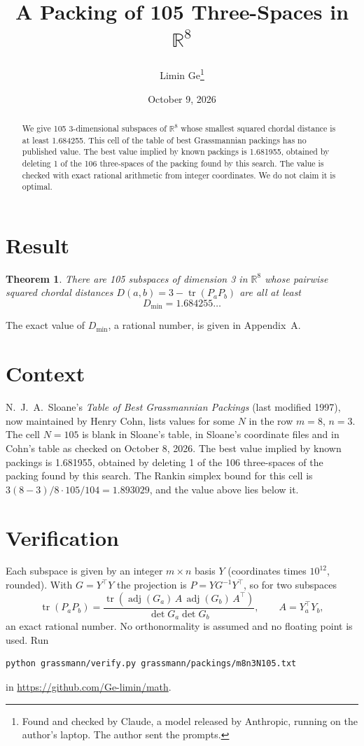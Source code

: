 \documentclass[11pt,a4paper]{article}
\title{A Packing of 105 Three-Spaces in $\mathbb{R}^{8}$}
\author{Limin Ge\thanks{Found and checked by Claude, a model released by Anthropic, running on the author's laptop. The author sent the prompts.}}
\date{October 9, 2026}
\newtheorem*{theorem}{Theorem}
\begin{document}
\maketitle
\begin{abstract}
We give 105 3-dimensional subspaces of $\mathbb{R}^{8}$ whose smallest squared chordal distance is at least 1.684255. This cell of the table of best Grassmannian packings has no published value. The best value implied by known packings is 1.681955, obtained by deleting 1 of the 106 three-spaces of the packing found by this search. The value is checked with exact rational arithmetic from integer coordinates. We do not claim it is optimal.
\end{abstract}

\section{Result}
\begin{theorem}
There are 105 subspaces of dimension 3 in $\mathbb{R}^{8}$ whose pairwise squared chordal distances $D(a,b) = 3 - \operatorname{tr}(P_aP_b)$ are all at least
\[ D_{\min} = 1.684255\ldots \]
\end{theorem}
The exact value of $D_{\min}$, a rational number, is given in Appendix~A.


\section{Context}
N.~J.~A.~Sloane's \emph{Table of Best Grassmannian Packings} (last modified 1997), now maintained by Henry Cohn, lists values for some $N$ in the row $m=8$, $n=3$. The cell $N=105$ is blank in Sloane's table, in Sloane's coordinate files and in Cohn's table as checked on October 8, 2026. The best value implied by known packings is 1.681955, obtained by deleting 1 of the 106 three-spaces of the packing found by this search. The Rankin simplex bound for this cell is $3(8-3)/8\cdot 105/104 = 1.893029$, and the value above lies below it.


\section{Verification}
Each subspace is given by an integer $m\times n$ basis $Y$ (coordinates times $10^{12}$, rounded). With $G=Y^\top Y$ the projection is $P=YG^{-1}Y^\top$, so for two subspaces
\[ \operatorname{tr}(P_aP_b)=\frac{\operatorname{tr}(\operatorname{adj}(G_a)\,A\,\operatorname{adj}(G_b)\,A^\top)}{\det G_a\det G_b},\qquad A=Y_a^\top Y_b, \]
an exact rational number. No orthonormality is assumed and no floating point is used. Run
\begin{verbatim}
python grassmann/verify.py grassmann/packings/m8n3N105.txt
\end{verbatim}
in \url{https://github.com/Ge-limin/math}.
\end{document}
